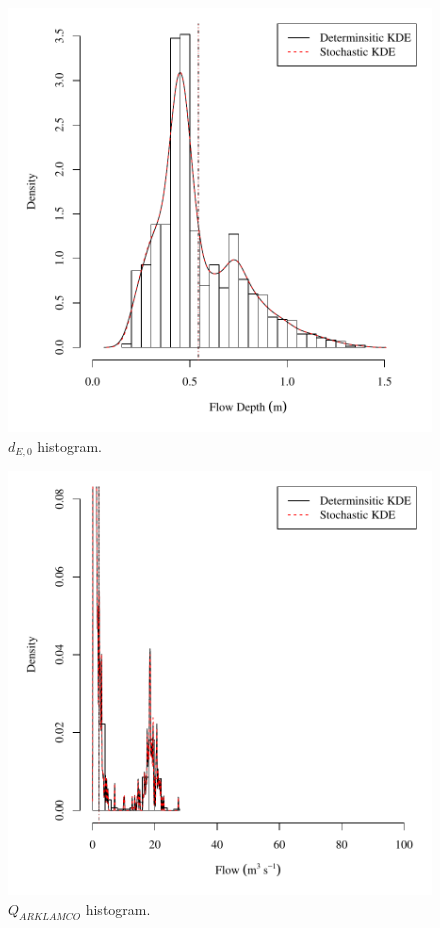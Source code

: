 \begin{center}
\begin{figure}[htbp]
	\includegraphics[width=6in]{"Figures/Results_USR/V density depthE1"}
	\caption{$d_{E,0}$ histogram.}
\end{figure}
\end{center}
\newpage

\begin{center}
\begin{figure}[htbp]
	\includegraphics[width=6in]{"Figures/Results_DSR/V density qin"}
	\caption{$Q_{ARKLAMCO}$ histogram.}
\end{figure}
\end{center}
\newpage

